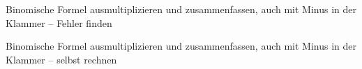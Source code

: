 \begin{aufgabe}{Binomische Formel ausmultiplizieren und zusammenfassen, auch mit Minus in der Klammer – Fehler finden}
\end{aufgabe}

\begin{aufgabe}{Binomische Formel ausmultiplizieren und zusammenfassen, auch mit Minus in der Klammer – selbst rechnen}
\end{aufgabe}
